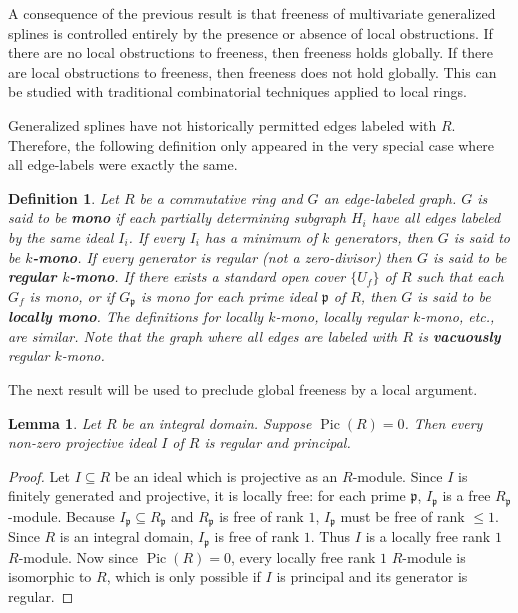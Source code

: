 \documentclass{article}
\DeclareMathOperator{\Pic}{Pic}
\newtheorem{definition}{Definition}
\newtheorem{lemma}{Lemma}
\begin{document}
A consequence of the previous result is that freeness of multivariate generalized splines is controlled entirely by the presence or absence of local obstructions. If there are no local obstructions to freeness, then freeness holds globally. If there are local obstructions to freeness, then freeness does not hold globally. This can be studied with traditional combinatorial techniques applied to local rings.

Generalized splines have not historically permitted edges labeled with $R$. Therefore, the following definition only appeared in the very special case where all edge-labels were exactly the same.


\begin{definition} 
Let $R$ be a commutative ring and $G$ an edge-labeled graph. $G$ is said to be \textbf{mono} if each partially determining subgraph $H_i$ have all edges labeled by the same ideal $I_i$. If every $I_i$ has a minimum of $k$ generators, then $G$ is said to be \textbf{$k$-mono}. If every generator is regular (not a zero-divisor) then $G$ is said to be \textbf{regular $k$-mono}. If there exists a standard open cover $\{U_{f}\}$ of $R$ such that each $G_{f}$ is mono, or if $G_{\mathfrak p}$ is mono for each prime ideal $\mathfrak p$ of $R$, then $G$ is said to be \textbf{locally mono}. The definitions for locally $k$-mono, locally regular $k$-mono, etc., are similar. Note that the graph where all edges are labeled with $R$ is \textbf{vacuously} regular $k$-mono.
\end{definition}

The next result will be used to preclude global freeness by a local argument.

\begin{lemma}
\label{lma:proj-ideal-principal}
Let $R$ be an integral domain. Suppose $\Pic(R)=0$. Then every non-zero projective ideal $I$ of $R$ is regular and principal.
\end{lemma}
\begin{proof}
Let $I \subseteq R$ be an ideal which is projective as an $R$-module. Since $I$ is finitely generated and projective, it is locally free: for each prime $\mathfrak p$, $I_{\mathfrak p}$ is a free $R_{\mathfrak p}$-module. Because $I_{\mathfrak p} \subseteq R_{\mathfrak p}$ and $R_{\mathfrak p}$ is free of rank $1$, $I_{\mathfrak p}$ must be free of rank $\le 1$. Since $R$ is an integral domain, $I_{\mathfrak p}$ is free of rank $1$. Thus $I$ is a locally free rank $1$ $R$-module. Now since $\Pic(R) = 0$, every locally free rank $1$ $R$-module is isomorphic to $R$, which is only possible if $I$ is principal and its generator is regular.
\end{proof}
\end{document}
